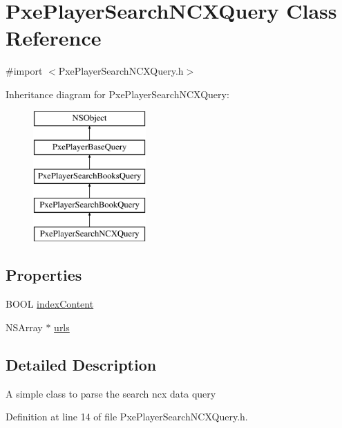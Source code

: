 \hypertarget{interface_pxe_player_search_n_c_x_query}{\section{Pxe\-Player\-Search\-N\-C\-X\-Query Class Reference}
\label{interface_pxe_player_search_n_c_x_query}
}


{\ttfamily \#import $<$Pxe\-Player\-Search\-N\-C\-X\-Query.\-h$>$}

Inheritance diagram for Pxe\-Player\-Search\-N\-C\-X\-Query\-:\begin{figure}[H]
\begin{center}
\leavevmode
\includegraphics[height=5.000000cm]{interface_pxe_player_search_n_c_x_query}
\end{center}
\end{figure}
\subsection*{Properties}
\begin{DoxyCompactItemize}
\item 
B\-O\-O\-L \hyperlink{interface_pxe_player_search_n_c_x_query_a23aabff1e2b366881022a16ad7d1e23d}{index\-Content}
\item 
N\-S\-Array $\ast$ \hyperlink{interface_pxe_player_search_n_c_x_query_aac947cec05fc498654dc4e6547920d02}{urls}
\end{DoxyCompactItemize}


\subsection{Detailed Description}
A simple class to parse the search ncx data query 

Definition at line 14 of file Pxe\-Player\-Search\-N\-C\-X\-Query.\-h.



